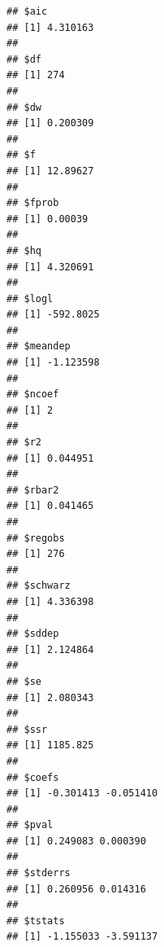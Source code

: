 \documentclass[
]{article}
\begin{document}
\begin{verbatim}
## $aic
## [1] 4.310163
## 
## $df
## [1] 274
## 
## $dw
## [1] 0.200309
## 
## $f
## [1] 12.89627
## 
## $fprob
## [1] 0.00039
## 
## $hq
## [1] 4.320691
## 
## $logl
## [1] -592.8025
## 
## $meandep
## [1] -1.123598
## 
## $ncoef
## [1] 2
## 
## $r2
## [1] 0.044951
## 
## $rbar2
## [1] 0.041465
## 
## $regobs
## [1] 276
## 
## $schwarz
## [1] 4.336398
## 
## $sddep
## [1] 2.124864
## 
## $se
## [1] 2.080343
## 
## $ssr
## [1] 1185.825
## 
## $coefs
## [1] -0.301413 -0.051410
## 
## $pval
## [1] 0.249083 0.000390
## 
## $stderrs
## [1] 0.260956 0.014316
## 
## $tstats
## [1] -1.155033 -3.591137
\end{verbatim}
\end{document}
